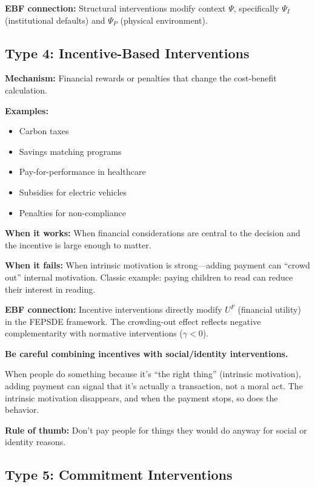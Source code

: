 \textbf{EBF connection:} Structural interventions modify context $\Psi$, specifically $\Psi_I$ (institutional defaults) and $\Psi_P$ (physical environment).

\subsection{Type 4: Incentive-Based Interventions}

\textbf{Mechanism:} Financial rewards or penalties that change the cost-benefit calculation.

\textbf{Examples:}
\begin{itemize}[nosep]
\item Carbon taxes
\item Savings matching programs
\item Pay-for-performance in healthcare
\item Subsidies for electric vehicles
\item Penalties for non-compliance
\end{itemize}

\textbf{When it works:} When financial considerations are central to the decision and the incentive is large enough to matter.

\textbf{When it fails:} When intrinsic motivation is strong---adding payment can ``crowd out'' internal motivation. Classic example: paying children to read can reduce their interest in reading.

\textbf{EBF connection:} Incentive interventions directly modify $U^F$ (financial utility) in the FEPSDE framework. The crowding-out effect reflects negative complementarity with normative interventions ($\gamma < 0$).

\begin{tcolorbox}[colback=yellow!5!white, colframe=yellow!75!black,
    title=Warning: Crowding Out]
\textbf{Be careful combining incentives with social/identity interventions.}

When people do something because it's ``the right thing'' (intrinsic motivation), adding payment can signal that it's actually a transaction, not a moral act. The intrinsic motivation disappears, and when the payment stops, so does the behavior.

\textbf{Rule of thumb:} Don't pay people for things they would do anyway for social or identity reasons.
\end{tcolorbox}

\subsection{Type 5: Commitment Interventions}

